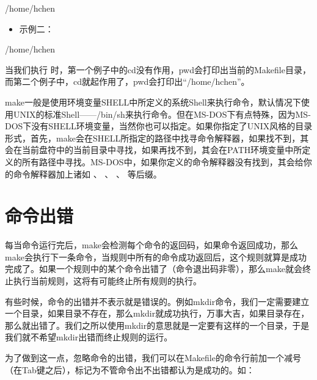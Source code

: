 \documentclass[a4paper,10pt]{sphinxmanual}
\begin{document}
\begin{sphinxVerbatim}[commandchars=\\\{\}]
     /home/hchen
\end{sphinxVerbatim}
\begin{itemize}
\item {} 
示例二：

\end{itemize}

\begin{sphinxVerbatim}[commandchars=\\\{\}]
     /home/hchen 
\end{sphinxVerbatim}

当我们执行  时，第一个例子中的cd没有作用，pwd会打印出当前的Makefile目录，而第二个例子中，cd就起作用了，pwd会打印出“/home/hchen”。

make一般是使用环境变量SHELL中所定义的系统Shell来执行命令，默认情况下使用UNIX的标准Shell——/bin/sh来执行命令。但在MS-DOS下有点特殊，因为MS-DOS下没有SHELL环境变量，当然你也可以指定。如果你指定了UNIX风格的目录形式，首先，make会在SHELL所指定的路径中找寻命令解释器，如果找不到，其会在当前盘符中的当前目录中寻找，如果再找不到，其会在PATH环境变量中所定义的所有路径中寻找。MS-DOS中，如果你定义的命令解释器没有找到，其会给你的命令解释器加上诸如  、
 、  、  等后缀。


\section{命令出错}
\label{\detokenize{recipes:id4}}
每当命令运行完后，make会检测每个命令的返回码，如果命令返回成功，那么make会执行下一条命令，当规则中所有的命令成功返回后，这个规则就算是成功完成了。如果一个规则中的某个命令出错了（命令退出码非零），那么make就会终止执行当前规则，这将有可能终止所有规则的执行。

有些时候，命令的出错并不表示就是错误的。例如mkdir命令，我们一定需要建立一个目录，如果目录不存在，那么mkdir就成功执行，万事大吉，如果目录存在，那么就出错了。我们之所以使用mkdir的意思就是一定要有这样的一个目录，于是我们就不希望mkdir出错而终止规则的运行。

为了做到这一点，忽略命令的出错，我们可以在Makefile的命令行前加一个减号 \sphinxcode{\sphinxupquote{-}} （在Tab键之后），标记为不管命令出不出错都认为是成功的。如：
\end{document}
